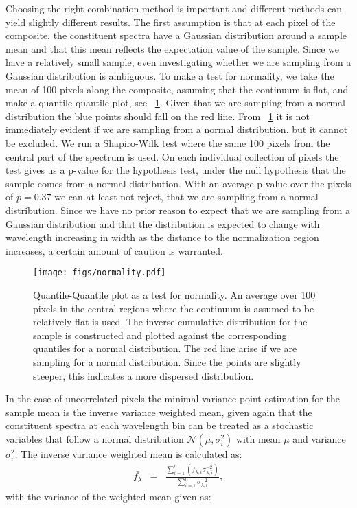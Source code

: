 \documentclass{aa}    %
\newcommand{\figref}[1]{\ref{fig:#1}}
\newcommand{\Fig}[1]{\figurename~\figref{#1}}
\newcommand{\fig}[1]{\Fig{#1}}
\newcommand{\figlabel}[1]{\label{fig:#1}}
\newcommand{\eqlabel}[1]{\label{eq:#1}}
\begin{document}
Choosing the right combination method is important and different
methods can yield slightly different results. The first assumption is
that at each pixel of the composite, the constituent spectra have a Gaussian
distribution around a sample mean and that this mean reflects the
expectation value of the sample. Since we have a relatively small
sample, even investigating whether we are sampling from a Gaussian
distribution is ambiguous. To make a test for normality, we take the
mean of 100 pixels along the composite, assuming that the continuum is
flat, and make a quantile-quantile plot, see \Fig{normality}. Given
that we are sampling from a normal distribution the blue points should
fall on the red line. From
\fig{normality} it is not immediately evident if we are sampling from
a normal distribution, but it cannot be excluded. We run a
Shapiro-Wilk test where the same 100 pixels from the central part of
the spectrum is used. On each individual collection of pixels the test
gives us a p-value for the hypothesis test,
under the null hypothesis that the sample comes from a normal
distribution. With an average p-value over the pixels of $p = 0.37$ we can at
least not reject, that we are sampling from a normal
distribution. Since we have no prior reason to expect that we are
sampling from a Gaussian distribution and that the distribution is
expected to change with wavelength increasing in width as the distance
to the normalization region increases, a certain amount of caution is
warranted.

\begin{figure}[t!]
  \centering
  \texttt{[image: figs/normality.pdf]}
  \caption[]{Quantile-Quantile plot as a test for normality. An average over 100
pixels in the central regions where the continuum is assumed to be relatively
flat is used. The inverse cumulative distribution for the sample is constructed
and plotted against the corresponding quantiles for a normal distribution. The
red line arise if we are sampling for a normal distribution. Since the points
are slightly steeper, this indicates a more dispersed distribution.}
 \figlabel{normality}
\end{figure}

In the case of uncorrelated pixels the minimal variance point estimation for the
sample mean is the inverse variance weighted mean, given again that the
constituent spectra at each wavelength bin can be treated as a stochastic
variables that follow a normal distribution $\mathcal{N}(\mu, \sigma_i^2)$ with
mean $\mu$ and variance $\sigma_i^2$. The inverse variance weighted mean is
calculated as:
\begin{eqnarray} \eqlabel{wmean}
\bar{f_{\lambda}} &=& \frac{ \sum_{i=1}^n \left( f_{\lambda, i} \sigma_{\lambda,
i}^{-2} \right)}{\sum_{i=1}^n \sigma_{\lambda, i}^{-2}},
\end{eqnarray}
with the variance of the weighted mean given as: 
\end{document}
